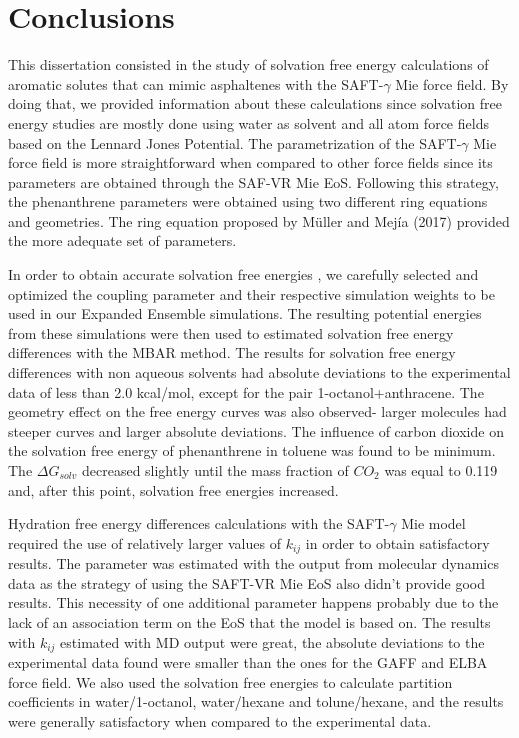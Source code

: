 \chapter{Conclusions} %

\label{Chapter6} %

This dissertation consisted in  the study of solvation free
energy calculations of aromatic solutes that can mimic asphaltenes with the SAFT-$\gamma$ 
Mie force field. By doing that, we provided information about these calculations since solvation free energy studies are mostly done using  water as solvent and all atom force fields based on the Lennard Jones Potential. The parametrization of the SAFT-$\gamma$  Mie force field is more straightforward
when compared to other force fields since its parameters are obtained through the SAF-VR
Mie EoS. Following this strategy, the phenanthrene parameters were obtained using two
different ring equations and geometries. The ring equation proposed by Müller and Mejía
(2017) provided the more adequate set of parameters.


In order to obtain accurate solvation free energies , we carefully selected and optimized the coupling parameter and their respective simulation weights to be used in our Expanded Ensemble simulations. The resulting potential energies from these simulations were then used to estimated solvation free energy differences with the MBAR method. The results for solvation free energy differences with non aqueous solvents had absolute deviations to the experimental
data of less than 2.0 kcal/mol, except for the pair 1-octanol+anthracene. The geometry
effect on the free energy curves was also observed- larger molecules had steeper curves
and larger absolute deviations. The influence of carbon dioxide on the solvation free
energy of phenanthrene in toluene was found to be minimum. The $\Delta G_{solv}$ decreased slightly until the mass fraction of $CO_{2}$ was equal to 0.119 and, after this point, solvation free
energies increased. 

Hydration free energy differences calculations with the SAFT-$\gamma$ Mie model
required the use of relatively larger values of $k_{ij}$ in order to obtain satisfactory results.
The parameter was estimated with the output from molecular dynamics data as
the strategy of using the SAFT-VR Mie EoS also didn’t provide good results. This
necessity of one additional parameter happens probably due to the lack of an association term
on the EoS that the model is based on. The results with $k_{ij}$ estimated with MD output
were great, the absolute deviations to the experimental data found were smaller than
the ones for the GAFF and ELBA force field. We also used the solvation free energies to calculate partition coefficients in water/1-octanol, water/hexane and tolune/hexane, and the results were generally satisfactory when compared to the experimental data.

